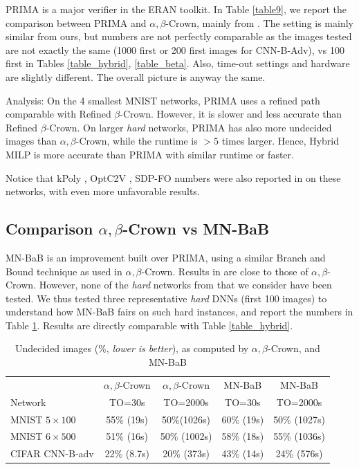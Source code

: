 	PRIMA \cite{prima} is a major verifier in the ERAN toolkit. In Table \ref{table9}, we report the comparison between PRIMA and $\alpha,\beta$-Crown, mainly from \cite{crown}. The setting is mainly similar from ours, but numbers are not perfectly comparable as the images tested are not  exactly the same (1000 first or 200 first images for CNN-B-Adv), vs 100 first in Tables \ref{table_hybrid}, \ref{table_beta}. Also, time-out settings and hardware are slightly different. The overall picture is anyway the same.


Analysis: On the 4 smallest MNIST networks, PRIMA uses a refined path comparable with Refined $\beta$-Crown. However, it is slower and less accurate than Refined $\beta$-Crown.
On larger {\em hard} networks, PRIMA has also more undecided images than $\alpha,\beta$-Crown, while the runtime is $>5$ times larger.
Hence, Hybrid MILP is more accurate than PRIMA with similar runtime or faster.

Notice that kPoly \cite{kpoly}, OptC2V \cite{optC2V}, SDP-FO \cite{SDPFI} numbers were also reported in \cite{crown} on these networks, with even more unfavorable results.

\subsection*{Comparison $\alpha,\beta$-Crown vs MN-BaB}

MN-BaB \cite{ferrari2022complete} is an improvement built over PRIMA, using a similar Branch and Bound technique as used in $\alpha,\beta$-Crown. Results in \cite{ferrari2022complete}
are close to those of $\alpha,\beta$-Crown. However, none of the {\em hard} networks from \cite{crown} that we consider have been tested. We thus tested three representative {\em hard} DNNs (first 100 images) to understand how MN-BaB fairs on such hard instances, and report the numbers in Table \ref{table10}. Results are directly comparable with Table \ref{table_hybrid}.


\begin{table}[h!]
	\centering
	\begin{tabular}{||l||c|c||c|c||}
		\hline \hline
		 & $\alpha,\beta$-Crown & $\alpha,\beta$-Crown & MN-BaB & MN-BaB \\ 
		 Network & TO=30s & TO=2000s &  TO=30s & TO=2000s \\ 
		\hline
		MNIST $5 \times 100$ & 55\% (19s) & 50\%(1026s) & 60\% (19s) & 50\% (1027s) \\ \hline
		MNIST $6 \times 500$ & 51\% (16s) & 50\% (1002s) & 58\% (18s) & 55\% (1036s) \\ \hline
		CIFAR CNN-B-adv & 22\% (8.7s) & 20\% (373s) & 43\% (14s) & 24\% (576s) \\ \hline 
	\end{tabular}
	\caption{Undecided images ($\%$, {\em lower is better}), as computed by $\alpha,\beta$-Crown, and MN-BaB}
	\label{table10}
\end{table}

